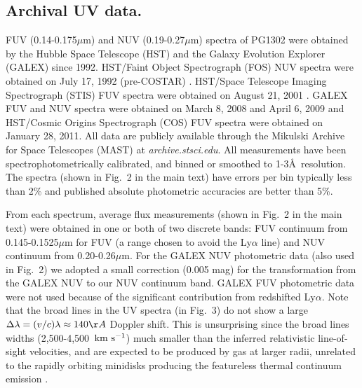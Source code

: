 \subsection{Archival UV data.}

FUV (0.14-0.175$\mu$m) and NUV (0.19-0.27$\mu$m) spectra of PG1302
were obtained by the Hubble Space Telescope (HST) and the Galaxy
Evolution Explorer (GALEX) since 1992.  HST/Faint Object Spectrograph
(FOS) NUV spectra were obtained on July 17, 1992
(pre-COSTAR) \cite{EvansKoratkar2004}.  HST/Space Telescope Imaging
Spectrograph (STIS) FUV spectra were obtained on August 21,
2001 \cite{Cooksey+2008}. GALEX FUV and NUV spectra were obtained on
March 8, 2008 and April 6, 2009 and HST/Cosmic Origins Spectrograph
(COS) FUV spectra were obtained on January 28, 2011. All data are
publicly available through the Mikulski Archive for Space Telescopes
(MAST) at {\it archive.stsci.edu}.  All measurements have been
spectrophotometrically calibrated, and binned or smoothed to
1-3\AA\ resolution.  The spectra (shown in Fig.~2 in the main text)
have errors per bin typically less than 2\% and published absolute
photometric accuracies are better than 5\%. 

From each spectrum, average flux measurements (shown in Fig.~2 in the
main text) were obtained in one or both of two discrete bands: FUV
continuum from 0.145-0.1525$\mu$m for FUV (a range chosen to avoid the
Ly$\alpha$ line) and NUV continuum from 0.20-0.26$\mu$m.  For the
GALEX NUV photometric data (also used in Fig.~2) we adopted a small
correction (0.005 mag) for the transformation from the GALEX NUV to
our NUV continuum band.  GALEX FUV photometric data were not used
because of the significant contribution from redshifted
Ly$\alpha$. Note that the broad lines in the UV spectra (in Fig.~3) do
not show a large $\Delta\lambda=(v/c)\lambda\approx 140\AA$ Doppler
shift. This is unsurprising since the broad lines widths
(2,500-4,500~${\rm km~s^{-1}}$) much smaller than the inferred
relativistic line-of-sight velocities, and are expected to be produced
by gas at larger radii, unrelated to the rapidly orbiting minidisks
producing the featureless thermal continuum emission \cite{PG1302MNRAS:2015a}.

\vspace{2\baselineskip}



